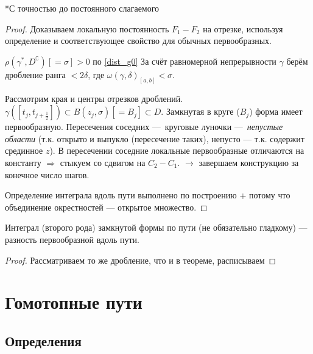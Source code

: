 \documentclass[12pt, a4paper, oneside]{memoir}
\begin{document}
\begin{theorem}

    *С точностью до постоянного слагаемого

    \begin{proof}
        \uniqueness Доказываем локальную постоянность $F_1 - F_2$ на отрезке,
    используя определение и соответствующее свойство для обычных первообразных.

        \existence $\rho\left(\gamma^*, D^\complement\right) [ = \sigma] > 0$ по \ref{dist_g0}
        За счёт равномерной непрерывности $\gamma$ берём дробление ранга $< 2\delta$,
        где $\omega(\gamma, \delta)_{[a, b]} < \sigma$.

        Рассмотрим края и центры отрезков дроблений. $\gamma([t_j, t_{j + \frac{1}{2}}]) \subset B(z_j, \sigma) [=B_j] \subset D$.
        Замкнутая в круге ($B_j$) форма имеет первообразную. 
        Пересечения соседних — круговые луночки — \textit{непустые области} (т.к. открыто и выпукло (пересечение таких), непусто — т.к. содержит срединное $z$).
        В пересечении соседние локальные первообразные отличаются на константу $\Rightarrow$ стыкуем со сдвигом на $C_2 - C_1$.
        $→$ завершаем конструкцию за конечное число шагов.

        Определение интеграла вдоль пути выполнено по построению + потому что объединение окрестностей — открытое множество.
    \end{proof}
\end{theorem}

\begin{corollary}

    Интеграл (второго рода) замкнутой формы по пути (не обязательно гладкому) 
    — разность первообразной вдоль пути.

    \begin{proof}
        Рассматриваем то же дробление, что и в теореме, расписываем
    \end{proof}
\end{corollary}


\section{Гомотопные пути}


\subsection{Определения}
\end{document}
